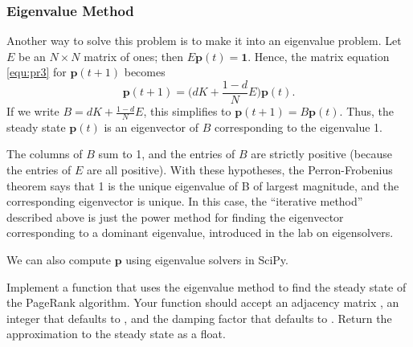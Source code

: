 \subsubsection*{Eigenvalue Method}
Another way to solve this problem is to make it into an eigenvalue problem.
Let $E$ be an $N \times N$ matrix of ones; then $E\mathbf{p}(t) = \mathbf{1}$.
Hence, the matrix equation \eqref{equ:pr3} for $\mathbf{p}(t+1)$ becomes
\[\mathbf{p}(t+1) = \Big(dK + \frac{1-d}{N}E\Big)\mathbf{p}(t).\]
If we write $B = dK + \frac{1-d}{N}E$, this simplifies to $\mathbf{p}(t+1) = B\mathbf{p}(t).$
Thus, the steady state $\mathbf{p}(t)$ is an eigenvector of $B$ corresponding to the eigenvalue 1.

The columns of $B$ sum to 1, and the entries of $B$ are strictly positive (because the entries of $E$ are all positive).
With these hypotheses, the Perron-Frobenius theorem says that 1 is the unique eigenvalue of B of largest magnitude, and the corresponding eigenvector is unique.
In this case, the ``iterative method'' described above is just the power method for finding the eigenvector corresponding to a dominant eigenvalue, introduced in the lab on eigensolvers. %

We can also compute $\mathbf{p}$ using eigenvalue solvers in SciPy.

\begin{problem}
Implement a function that uses the eigenvalue method to find the steady state of the PageRank algorithm. Your function should accept an adjacency matrix , an integer  that defaults to , and the damping factor  that defaults to . Return the approximation to the steady state as a float.

\end{problem}


